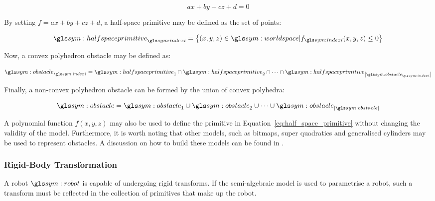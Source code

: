 		\begin{equation}
			ax + by + cz + d = 0
		\end{equation}

		By setting
		\(
			f = ax + by +cz + d
		\),
		a half-space primitive may be defined as the set of points:

		\begin{equation}
			\halfspaceprimitive_{\indexi} =
				\left\{
					(x,y,z) \in \world |
					f_{\indexi}(x,y,z) \leq 0
				\right\}
				\label{eq:half_space_primitive}
		\end{equation}

		Now, a convex polyhedron obstacle may be
		defined as:

		\begin{equation}
			\obstacle_{\indexi} =
				\halfspaceprimitive_1 \cap \halfspaceprimitive_2 \cap \cdots \cap
				\halfspaceprimitive_{\cardinality{\obstacle_{\indexi}}}
				\label{eq:convex_obstacle}
		\end{equation}

		Finally, a non-convex polyhedron obstacle can be formed by the union of
		convex polyhedra:

		\begin{equation}
			\obstacle =
				\obstacle_1 \cup \obstacle_2 \cup \cdots \cup \obstacle_{\cardinality{\obstacle}}
				\label{eq:non_convex_obstacle}
		\end{equation}

		A polynomial function $f(x,y,z)$ may also be used to define the
		primitive in Equation~\ref{eq:half_space_primitive} without changing the
		validity of the model. Furthermore, it is worth noting that other
		models, such as bitmaps, super quadratics and generalised cylinders may
		be used to represent obstacles. A discussion on how to build these
		models can be found in .

		\subsubsection{Rigid-Body Transformation}%
		\label{sec:rigid_body_transformation}

			A robot $\robot$ is capable of undergoing rigid transforms. If the
			semi-algebraic model is used to parametrise a robot, such a
			transform must be reflected in the collection of primitives that
			make up the robot.

